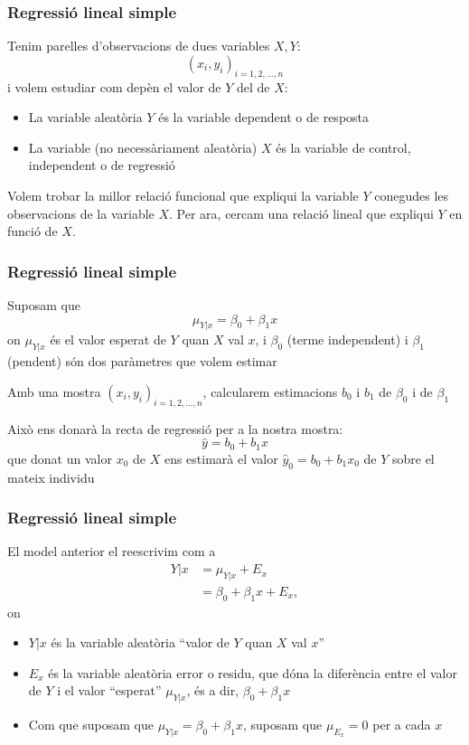 \documentclass[12pt,t]{beamer}
\renewcommand{\emph}[1]{{\color{red}#1}}
\theoremstyle{plain}
\theoremstyle{definition}
\begin{document}
\begin{frame}
\frametitle{Regressió lineal simple}
Tenim parelles d'observacions de dues variables $X,Y$:
$$
(x_i,y_i)_{i=1,2,\ldots,n}
$$
i volem estudiar com depèn el valor de $Y$ del de $X$:
\medskip

\begin{itemize}
\item La variable aleatòria $Y$ és la variable \emph{dependent} o \emph{de resposta}

\item La variable (no necessàriament aleatòria) $X$ és la variable \emph{de control},
\emph{independent} o \emph{de regressió}
\end{itemize}
\bigskip

Volem trobar la millor relació funcional que  expliqui la variable $Y$ conegudes les observacions de la
variable $X$. Per ara, cercam una \emph{relació lineal} que expliqui $Y$ en funció de $X$.
\end{frame}

\begin{frame}
\frametitle{Regressió lineal simple}

Suposam que 
$$
\mu_{Y|x}=\beta_0+\beta_1 x
$$
on $\mu_{Y|x}$ és el valor esperat de $Y$ quan $X$ val $x$, i $\beta_0$
(\emph{terme independent}) i $\beta_1$ (\emph{pendent}) són dos
paràmetres que volem estimar
\medskip

Amb una mostra $(x_i,y_i)_{i=1,2,\ldots,n}$, calcularem estimacions $b_0$ i $b_1$ de
$\beta_0$ i de $\beta_1$
\medskip

Això ens donarà la \emph{recta de regressió} per a la nostra mostra:
$$
\widehat{y}=b_0+b_1 x
$$
que donat un valor $x_0$ de $X$ ens estimarà el valor $\widehat{y}_0=b_0+b_1 x_0$ de $Y$ sobre el mateix individu
\end{frame}

\begin{frame}
\frametitle{Regressió lineal simple}

El model anterior el reescrivim com a
$$
\begin{array}{rl}
Y|x &=\mu_{Y|x}+ E_x\\
&=\beta_0+\beta_1 x+ E_x,
\end{array}
$$
on
\begin{itemize}
\item $Y|x$ és la variable aleatòria ``valor de $Y$ quan $X$ val $x$''
\medskip

\item $E_x$ és la variable aleatòria \emph{error} o \emph{residu}, que dóna la diferència entre el valor de $Y$ i el valor ``esperat'' $\mu_{Y|x}$, és a dir, $\beta_0+\beta_1 x$
\medskip

\item Com que suposam que $\mu_{Y|x}=\beta_0+\beta_1 x$, suposam que $\mu_{E_x}=0$ per a cada $x$
\end{itemize}

\end{frame}
\end{document}

